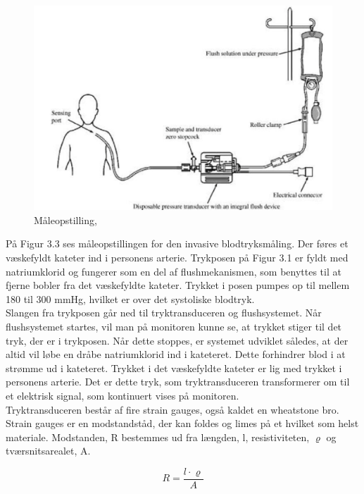 \begin{figure}[H]
	\centering
	\includegraphics[width=1\textwidth]{Figurer/Snip20151207_50}
	\caption{Måleopstilling, \protect\cite[s. 296]{Billed for invasiv blodtryksmaling}}
\end{figure}

På Figur 3.3 ses måleopstillingen for den invasive blodtryksmåling. Der føres et væskefyldt kateter ind i personens arterie. Trykposen på Figur 3.1 er fyldt med natriumklorid og fungerer som en del af flushmekanismen, som benyttes til at fjerne bobler fra det væskefyldte kateter. Trykket i posen pumpes op til mellem 180 til 300 mmHg, hvilket er over det systoliske blodtryk. \\
Slangen fra trykposen går ned til tryktransduceren og flushsystemet. Når flushsystemet startes, vil man på monitoren kunne se, at trykket stiger til det tryk, der er i trykposen. Når dette stoppes, er systemet udviklet således, at der altid vil løbe en dråbe natriumklorid ind i kateteret. Dette forhindrer blod i at strømme ud i kateteret. Trykket i det væskefyldte kateter er lig med trykket i personens arterie. Det er dette tryk, som tryktransduceren transformerer om til et elektrisk signal, som kontinuert vises på monitoren. \\
Tryktransduceren består af fire strain gauges, også kaldet en wheatstone bro. Strain gauges er en modstandståd, der kan foldes og limes på et hvilket som helst materiale. Modstanden, R bestemmes ud fra længden, l, resistiviteten, $\varrho$ og tværsnitsarealet, A. 

\begin{equation}
	R = \frac{l \cdot \varrho}{A}
\end{equation}

